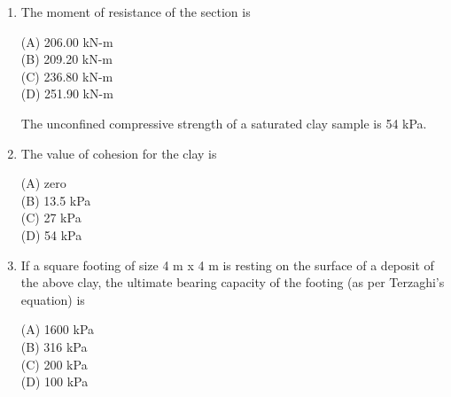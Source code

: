\documentclass[journal,12pt,onecolumn]{IEEEtran}
\theoremstyle{remark}
\begin{document}
\begin{enumerate}
\setlength{\parskip}{0.5cm}

\hfill{}

\begin{multicols}{4}
\noindent(A) 205.30 mm\\
(B) 184.56 mm\\
(C) 160.91 mm\\
(D) 145.30 mm
\end{multicols}

\setlength{\parskip}{0.5cm}
\noindent\item The moment of resistance of the section is

\setlength{\parskip}{0.5cm}

\hfill{}

\begin{multicols}{4}
\noindent(A) 206.00 kN-m\\
(B) 209.20 kN-m\\
(C) 236.80 kN-m\\
(D) 251.90 kN-m
\end{multicols}

\setlength{\parskip}{0.5cm}


The unconfined compressive strength of a saturated clay sample is 54 kPa.

\setlength{\parskip}{0.5cm}

\noindent\item The value of cohesion for the clay is

\setlength{\parskip}{0.5cm}

\hfill{}

\begin{multicols}{4}
\noindent(A) zero\\
(B) 13.5 kPa\\
(C) 27 kPa\\
(D) 54 kPa
\end{multicols}

\setlength{\parskip}{0.5cm}
\noindent\item If a square footing of size 4 m x 4 m is resting on the surface of a deposit of the above clay, the ultimate bearing capacity of the footing (as per Terzaghi’s equation) is

\setlength{\parskip}{0.5cm}

\hfill{}

\begin{multicols}{4}
\noindent(A) 1600 kPa\\
(B) 316 kPa\\
(C) 200 kPa\\
(D) 100 kPa
\end{multicols}



\end{enumerate}
\end{document}
